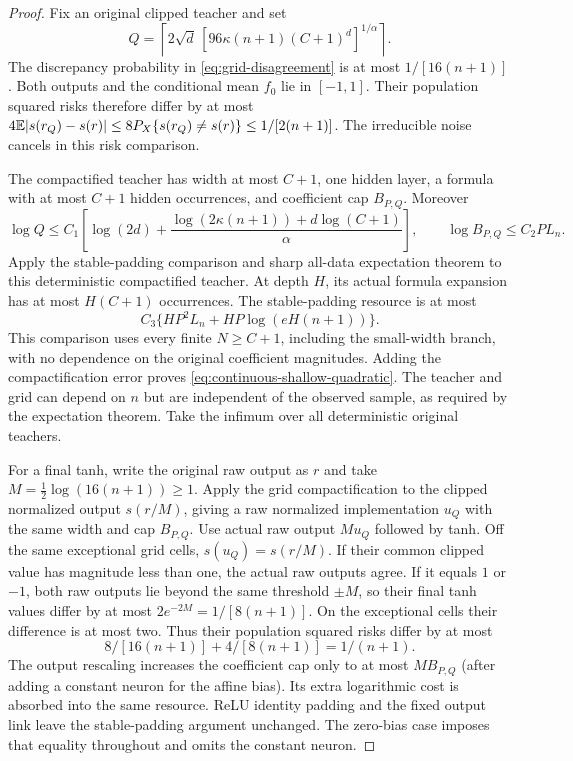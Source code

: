 \begin{proof}
Fix an original clipped teacher and set
\[
 Q=\left\lceil2\sqrt d\,
       [96\kappa(n+1)(C+1)^d]^{1/\alpha}\right\rceil.
\]
The discrepancy probability in \eqref{eq:grid-disagreement} is at most $1/[16(n+1)]$. Both outputs and the conditional mean $f_0$ lie in $[-1,1]$. Their population squared risks therefore differ by at most
$4\mathbb E|s(r_Q)-s(r)|\le8P_X\{s(r_Q)\ne s(r)\}\le1/[2(n+1)]$.
The irreducible noise cancels in this risk comparison.

The compactified teacher has width at most $C+1$, one hidden layer, a formula with at most $C+1$ hidden occurrences, and coefficient cap $B_{P,Q}$. Moreover
\[
 \log Q\le C_1\left[\log(2d)+
           \frac{\log(2\kappa(n+1))+d\log(C+1)}\alpha\right],
 \qquad \log B_{P,Q}\le C_2P L_n.
\]
Apply the stable-padding comparison and sharp all-data expectation theorem to this deterministic compactified teacher. At depth $H$, its actual formula expansion has at most $H(C+1)$ occurrences. The stable-padding resource is at most
\[
 C_3\{HP^2L_n+HP\log(eH(n+1))\}.
\]
This comparison uses every finite $N\ge C+1$, including the small-width branch, with no dependence on the original coefficient magnitudes. Adding the compactification error proves \eqref{eq:continuous-shallow-quadratic}. The teacher and grid can depend on $n$ but are independent of the observed sample, as required by the expectation theorem. Take the infimum over all deterministic original teachers.

For a final tanh, write the original raw output as $r$ and take
$M=\tfrac12\log(16(n+1))\ge1$. Apply the grid compactification to the clipped normalized output $s(r/M)$, giving a raw normalized implementation $u_Q$ with the same width and cap $B_{P,Q}$. Use actual raw output $M u_Q$ followed by tanh. Off the same exceptional grid cells, $s(u_Q)=s(r/M)$. If their common clipped value has magnitude less than one, the actual raw outputs agree. If it equals $1$ or $-1$, both raw outputs lie beyond the same threshold $\pm M$, so their final tanh values differ by at most $2e^{-2M}=1/[8(n+1)]$. On the exceptional cells their difference is at most two. Thus their population squared risks differ by at most
\[
 8/[16(n+1)]+4/[8(n+1)]=1/(n+1).
\]
The output rescaling increases the coefficient cap only to at most $M B_{P,Q}$ (after adding a constant neuron for the affine bias). Its extra logarithmic cost is absorbed into the same resource. ReLU identity padding and the fixed output link leave the stable-padding argument unchanged. The zero-bias case imposes that equality throughout and omits the constant neuron.
\end{proof}
